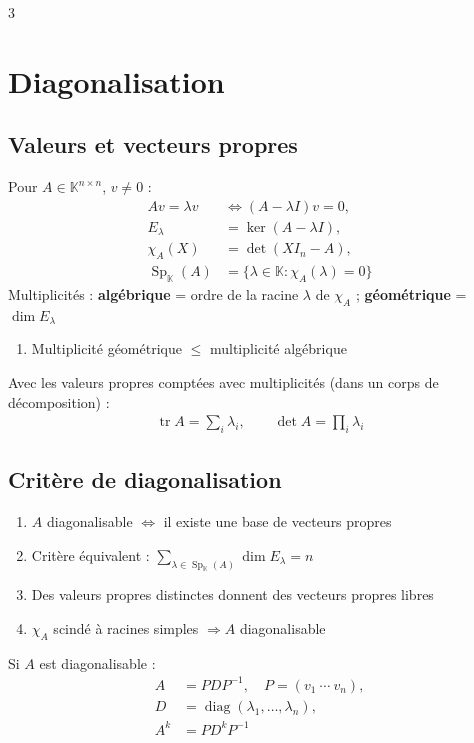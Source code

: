 \documentclass[12pt, a4paper]{article}
\newcommand{\KK}{\mathbb{K}}
\newcommand{\tr}{\operatorname{tr}}
\newcommand{\Sp}{\operatorname{Sp}}
\begin{document}
\begin{multicols*}{3}
\colbreak
\section{Diagonalisation}
\subsection{Valeurs et vecteurs propres}
Pour $A\in\KK^{n\times n}$, $v\ne0$ :
\begin{align*}
Av=\lambda v&\iff(A-\lambda I)v=0,\\
E_\lambda&=\ker(A-\lambda I),\\
\chi_A(X)&=\det(XI_n-A),\\
\Sp_\KK(A)&=\{\lambda\in\KK:\chi_A(\lambda)=0\}
\end{align*}
Multiplicités : \textbf{algébrique} = ordre de la racine $\lambda$ de $\chi_A$ ; \textbf{géométrique} = $\dim E_\lambda$
\begin{enumerate}
\item Multiplicité géométrique $\le$ multiplicité algébrique
\end{enumerate}
Avec les valeurs propres comptées avec multiplicités (dans un corps de décomposition) :
\begin{align*}
\tr A=\sum_i\lambda_i,\qquad\det A=\prod_i\lambda_i
\end{align*}

\subsection{Critère de diagonalisation}
\begin{enumerate}
\item $A$ diagonalisable $\iff$ il existe une base de vecteurs propres
\item Critère équivalent : $\displaystyle\sum_{\lambda\in\Sp_\KK(A)}\dim E_\lambda=n$
\item Des valeurs propres distinctes donnent des vecteurs propres libres
\item $\chi_A$ scindé à racines simples $\Rightarrow A$ diagonalisable
\end{enumerate}
Si $A$ est diagonalisable :
\begin{align*}
A&=PDP^{-1},\quad P=(v_1\ \cdots\ v_n),\\
D&=\operatorname{diag}(\lambda_1,\ldots,\lambda_n),\\
A^k&=PD^kP^{-1}
\end{align*}
\colbreak


\end{multicols*}
\end{document}
